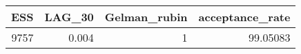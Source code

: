 \begin{longtable}{rrrr}
\toprule
ESS & LAG\_30 & Gelman\_rubin & acceptance\_rate \\ 
\midrule
9757 & 0.004 & 1 & 99.05083 \\ 
\bottomrule
\end{longtable}

